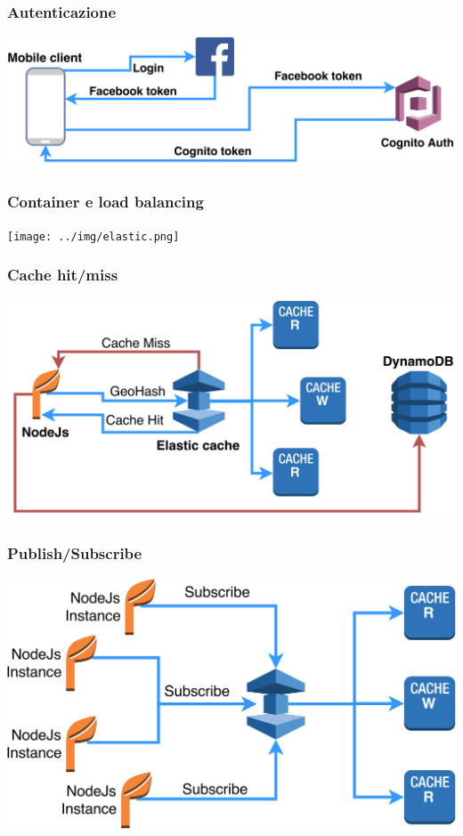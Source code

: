 \documentclass{beamer}
\begin{document}

\begin{frame}
\frametitle{Autenticazione}
\centerline{\includegraphics[scale=0.07]{../img/mobile_auth.png}}
\end{frame}


\begin{frame}
\frametitle{Container e load balancing}
\centerline{\texttt{[image: ../img/elastic.png]}}
\end{frame}


\begin{frame}
\frametitle{Cache hit/miss}
\centerline{\includegraphics[scale=0.07]{../img/DataFetch.png}}
\end{frame}



\begin{frame}
\frametitle{Publish/Subscribe}
\centerline{\includegraphics[scale=0.07]{../img/subscribe.png}}
\end{frame}
\end{document}
